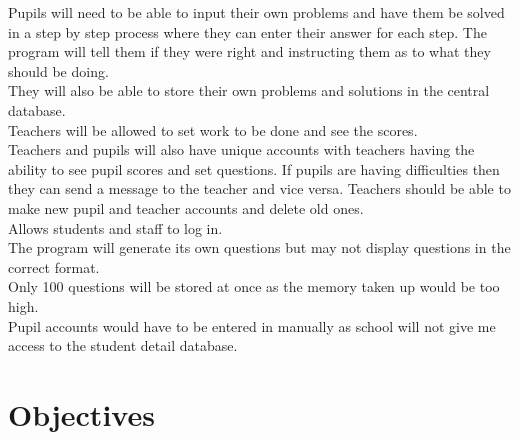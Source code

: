 \documentclass[a4paper,12pt]{report}
\begin{document}
Pupils will need to be able to input their own problems and have them be solved in a step by step process where they can enter their answer for each step. The program will tell them if they were right and instructing them as to what they should be doing.\\
 They will also be able to store their own problems and solutions in the central database.\\
 Teachers will be allowed to set work to be done and see the scores.\\
 Teachers and pupils will also have unique accounts with teachers having the ability to see pupil scores and set questions. If pupils are having difficulties then they can send a message to the teacher and vice versa. Teachers should be able to make new pupil and teacher accounts and delete old ones.\\
 Allows students and staff to log in.\\
 The program will generate its own questions but may not display questions in the correct format.\\
 Only 100 questions will be stored at once as the memory taken up would be too high.\\
 Pupil accounts would have to be entered in manually as school will not give me access to the student detail database.\\

\section{Objectives}
\end{document}
